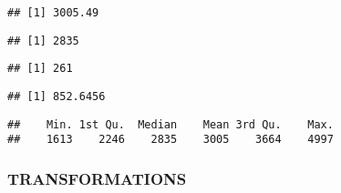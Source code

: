 \documentclass[11pt,]{article}
\newenvironment{Shaded}{\begin{snugshade}}{\end{snugshade}}
\newcommand{\CommentTok}[1]{\textcolor[rgb]{0.56,0.35,0.01}{\textit{#1}}}
\newcommand{\KeywordTok}[1]{\textcolor[rgb]{0.13,0.29,0.53}{\textbf{#1}}}
\newcommand{\NormalTok}[1]{#1}
\newcommand{\OperatorTok}[1]{\textcolor[rgb]{0.81,0.36,0.00}{\textbf{#1}}}
\begin{document}
\begin{verbatim}
## [1] 3005.49
\end{verbatim}

\begin{Shaded}
\end{Shaded}

\begin{verbatim}
## [1] 2835
\end{verbatim}

\begin{Shaded}
\end{Shaded}

\begin{verbatim}
## [1] 261
\end{verbatim}

\begin{Shaded}
\end{Shaded}

\begin{verbatim}
## [1] 852.6456
\end{verbatim}

\begin{Shaded}
\end{Shaded}

\begin{verbatim}
##    Min. 1st Qu.  Median    Mean 3rd Qu.    Max. 
##    1613    2246    2835    3005    3664    4997
\end{verbatim}

\hypertarget{transformations}{%
\subsubsection{TRANSFORMATIONS}\label{transformations}}
\end{document}
